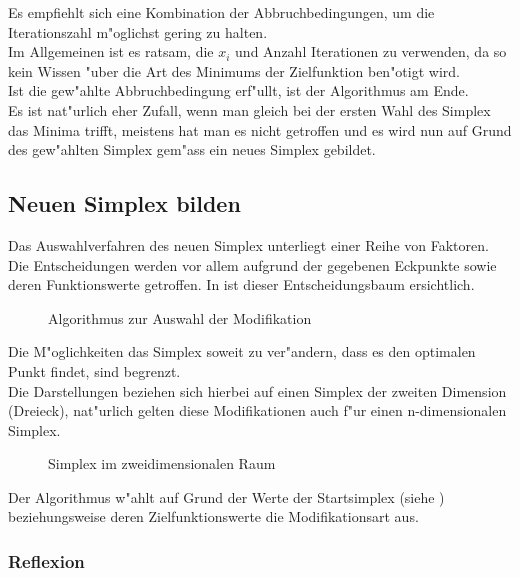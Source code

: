 Es empfiehlt sich eine Kombination der Abbruchbedingungen, um die Iterationszahl m"oglichst gering zu halten.\\
Im Allgemeinen ist es ratsam, die $x_i$ und Anzahl Iterationen zu verwenden, da so kein Wissen "uber die Art des Minimums der Zielfunktion ben"otigt wird.\\
Ist die gew"ahlte Abbruchbedingung erf"ullt, ist der Algorithmus am Ende.\\
Es ist nat"urlich eher Zufall, wenn man gleich bei der ersten Wahl des Simplex das Minima trifft, meistens hat man es nicht getroffen und es wird nun auf Grund des gew"ahlten Simplex gem"ass  ein neues Simplex gebildet.

\subsection{Neuen Simplex bilden}
\label{sec:downhillModi}

Das Auswahlverfahren des neuen Simplex unterliegt einer Reihe von Faktoren. Die Entscheidungen werden vor allem aufgrund der gegebenen Eckpunkte sowie deren Funktionswerte getroffen.
In  ist dieser Entscheidungsbaum ersichtlich.

\begin{figure}[h]

\caption{Algorithmus zur Auswahl der Modifikation}
\label{fig:downhillalg2}
\end{figure}

Die M"oglichkeiten das Simplex soweit zu ver"andern, dass es den optimalen Punkt findet, sind begrenzt.\\
Die Darstellungen beziehen sich hierbei auf einen Simplex der zweiten Dimension (Dreieck), nat"urlich gelten diese Modifikationen auch f"ur einen n-dimensionalen Simplex.

\begin{figure}[h]
	\centering
  	\caption{Simplex im zweidimensionalen Raum}%
	\label{fig:downhillStart}
\end{figure}

Der Algorithmus w"ahlt auf Grund der Werte der Startsimplex (siehe ) beziehungsweise deren Zielfunktionswerte die Modifikationsart aus.

\subsubsection{Reflexion}

